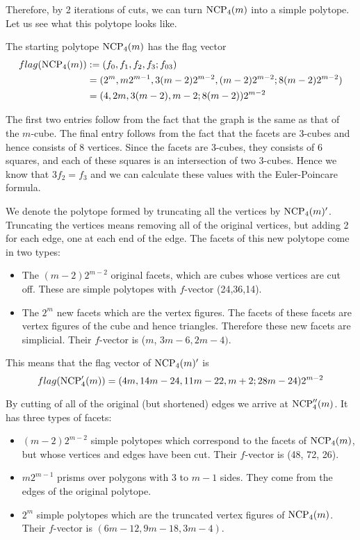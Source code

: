 Therefore, by 2 iterations of cuts, we can turn $\textrm{NCP}_4(m)$ into a simple 
polytope. Let us see what this polytope looks like. 

The starting polytope $\textrm{NCP}_4(m)$ has the flag vector 
\begin{align}
 flag(\textrm{NCP}_4(m)) &:= (f_0, f_1, f_2, f_3; f_{03}) \\
	&= (2^m, m2^{m-1}, 3(m-2)2^{m-2}, (m-2)2^{m-2}; 8(m-2)2^{m-2}) \\
	&= (4, 2m, 3(m-2), m-2; 8(m-2))2^{m-2}
\end{align}

The first two entries follow from the fact that the graph is the same as that 
of the $m$-cube. The final entry follows from the fact that the facets are 
3-cubes and hence consists of 8 vertices. Since the facets are 3-cubes, they 
consists of 6 squares, and each of these squares is an intersection of two 
3-cubes. Hence we know that $3f_2 = f_3$ and we can calculate these values with 
the Euler-Poincare formula.

We denote the polytope formed by truncating all the vertices by $\textrm{NCP}_4(m)'$.
Truncating the vertices means removing all of the original vertices, but 
adding 2 for each edge, one at each end of the edge. The facets of this new 
polytope come in two types:

\begin{itemize}
 \item The $(m-2)2^{m-2}$ original facets, which are cubes whose vertices are 
cut off. These are simple polytopes with $f$-vector (24,36,14).
 \item The $2^m$ new facets which are the vertex figures. The facets of these 
facets are vertex figures of the cube and hence triangles. Therefore these 
new facets are simplicial. Their $f$-vector is ($m$, 
$3m-6, 2m-4)$.
\end{itemize}

This means that the flag vector of $\textrm{NCP}_4(m)'$ is 
\begin{equation}
 flag(\textrm{NCP}'_4(m)) = (4m, 14m-24, 11m-22, m+2; 28m-24)2^{m-2}
\end{equation}

By cutting of all of the original (but shortened) edges we arrive at 
$\textrm{NCP}''_4(m)$. It has three types of facets:

\begin{itemize}
 \item $(m-2)2^{m-2}$ simple polytopes which correspond to the facets of 
$\textrm{NCP}_4(m)$, but whose vertices and edges have been cut. Their $f$-vector is 
(48, 72, 26).
\item $m2^{m-1}$ prisms over polygons with $3$ to $m-1$ sides. They come from 
the edges of the original polytope.
\item $2^m$ simple polytopes which are the truncated vertex figures of 
$\textrm{NCP}_4(m)$. Their $f$-vector is $(6m - 12, 9m-18, 3m-4)$.
\end{itemize}

